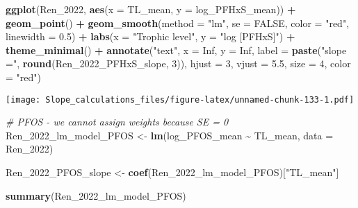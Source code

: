 \documentclass[
]{article}
\newenvironment{Shaded}{\begin{snugshade}}{\end{snugshade}}
\newcommand{\AttributeTok}[1]{\textcolor[rgb]{0.13,0.29,0.53}{#1}}
\newcommand{\CommentTok}[1]{\textcolor[rgb]{0.56,0.35,0.01}{\textit{#1}}}
\newcommand{\ConstantTok}[1]{\textcolor[rgb]{0.56,0.35,0.01}{#1}}
\newcommand{\DecValTok}[1]{\textcolor[rgb]{0.00,0.00,0.81}{#1}}
\newcommand{\FloatTok}[1]{\textcolor[rgb]{0.00,0.00,0.81}{#1}}
\newcommand{\FunctionTok}[1]{\textcolor[rgb]{0.13,0.29,0.53}{\textbf{#1}}}
\newcommand{\NormalTok}[1]{#1}
\newcommand{\OtherTok}[1]{\textcolor[rgb]{0.56,0.35,0.01}{#1}}
\newcommand{\SpecialCharTok}[1]{\textcolor[rgb]{0.81,0.36,0.00}{\textbf{#1}}}
\newcommand{\StringTok}[1]{\textcolor[rgb]{0.31,0.60,0.02}{#1}}
\begin{document}
\begin{Shaded}
\begin{Highlighting}[]
\FunctionTok{ggplot}\NormalTok{(Ren\_2022, }\FunctionTok{aes}\NormalTok{(}\AttributeTok{x =}\NormalTok{ TL\_mean, }\AttributeTok{y =}\NormalTok{ log\_PFHxS\_mean)) }\SpecialCharTok{+}
  \FunctionTok{geom\_point}\NormalTok{() }\SpecialCharTok{+}
  \FunctionTok{geom\_smooth}\NormalTok{(}\AttributeTok{method =} \StringTok{"lm"}\NormalTok{, }\AttributeTok{se =} \ConstantTok{FALSE}\NormalTok{, }\AttributeTok{color =} \StringTok{"red"}\NormalTok{, }\AttributeTok{linewidth =} \FloatTok{0.5}\NormalTok{) }\SpecialCharTok{+}
  \FunctionTok{labs}\NormalTok{(}\AttributeTok{x =} \StringTok{"Trophic level"}\NormalTok{,}
       \AttributeTok{y =} \StringTok{"log [PFHxS]"}\NormalTok{) }\SpecialCharTok{+}
  \FunctionTok{theme\_minimal}\NormalTok{() }\SpecialCharTok{+}
  \FunctionTok{annotate}\NormalTok{(}\StringTok{"text"}\NormalTok{, }\AttributeTok{x =} \ConstantTok{Inf}\NormalTok{, }\AttributeTok{y =} \ConstantTok{Inf}\NormalTok{, }\AttributeTok{label =} \FunctionTok{paste}\NormalTok{(}\StringTok{"slope ="}\NormalTok{, }\FunctionTok{round}\NormalTok{(Ren\_2022\_PFHxS\_slope, }\DecValTok{3}\NormalTok{)), }
           \AttributeTok{hjust =} \DecValTok{3}\NormalTok{, }\AttributeTok{vjust =} \FloatTok{5.5}\NormalTok{, }\AttributeTok{size =} \DecValTok{4}\NormalTok{, }\AttributeTok{color =} \StringTok{"red"}\NormalTok{)}
\end{Highlighting}
\end{Shaded}

\texttt{[image: Slope\_calculations\_files/figure-latex/unnamed-chunk-133-1.pdf]}

\begin{Shaded}
\begin{Highlighting}[]
\CommentTok{\# PFOS {-} we cannot assign weights because SE = 0}
\NormalTok{Ren\_2022\_lm\_model\_PFOS }\OtherTok{\textless{}{-}} \FunctionTok{lm}\NormalTok{(log\_PFOS\_mean }\SpecialCharTok{\textasciitilde{}}\NormalTok{ TL\_mean,}
                              \AttributeTok{data =}\NormalTok{ Ren\_2022)}

\NormalTok{Ren\_2022\_PFOS\_slope }\OtherTok{\textless{}{-}} \FunctionTok{coef}\NormalTok{(Ren\_2022\_lm\_model\_PFOS)[}\StringTok{"TL\_mean"}\NormalTok{]}

\FunctionTok{summary}\NormalTok{(Ren\_2022\_lm\_model\_PFOS)}
\end{Highlighting}
\end{Shaded}
\end{document}
